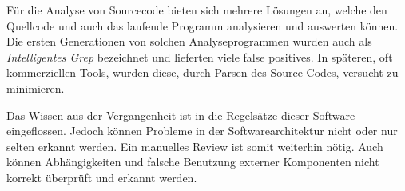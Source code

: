 Für die Analyse von Sourcecode bieten sich mehrere Lösungen an, welche den Quellcode und auch das laufende Programm analysieren und auswerten können. Die ersten Generationen von solchen Analyseprogrammen wurden auch als \textit{Intelligentes Grep} bezeichnet und lieferten viele false positives. In späteren, oft kommerziellen Tools, wurden diese, durch Parsen des Source-Codes, versucht zu minimieren.

Das Wissen aus der Vergangenheit ist in die Regelsätze dieser Software eingeflossen. Jedoch können Probleme in der Softwarearchitektur nicht oder nur selten erkannt werden. Ein manuelles Review ist somit weiterhin nötig. Auch können Abhängigkeiten und falsche Benutzung externer Komponenten nicht korrekt überprüft und erkannt werden.

